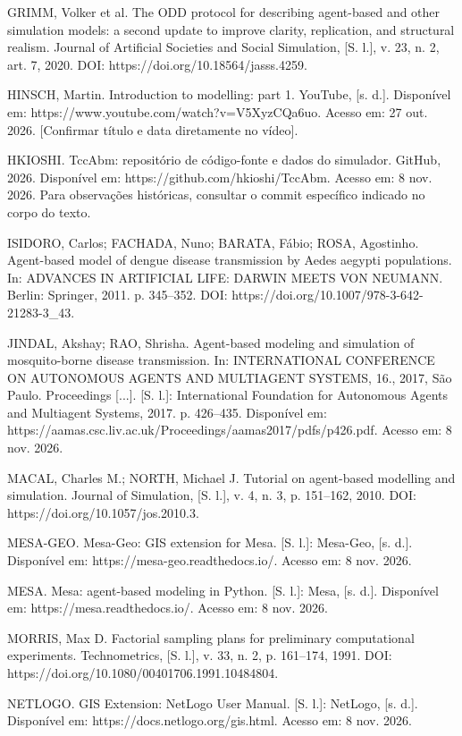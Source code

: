 GRIMM, Volker et al. The ODD protocol for describing agent-based and
other simulation models: a second update to improve clarity,
replication, and structural realism. Journal of Artificial Societies and
Social Simulation, {[}S. l.{]}, v. 23, n. 2, art. 7, 2020. DOI:
https://doi.org/10.18564/jasss.4259.

HINSCH, Martin. Introduction to modelling: part 1. YouTube, {[}s. d.{]}.
Disponível em: https://www.youtube.com/watch?v=V5XyzCQa6uo. Acesso em:
27 out. 2026. {[}Confirmar título e data diretamente no vídeo{]}.

HKIOSHI. TccAbm: repositório de código-fonte e dados do simulador.
GitHub, 2026. Disponível em: https://github.com/hkioshi/TccAbm. Acesso
em: 8 nov. 2026. Para observações históricas, consultar o commit
específico indicado no corpo do texto.

ISIDORO, Carlos; FACHADA, Nuno; BARATA, Fábio; ROSA, Agostinho.
Agent-based model of dengue disease transmission by Aedes aegypti
populations. In: ADVANCES IN ARTIFICIAL LIFE: DARWIN MEETS VON NEUMANN.
Berlin: Springer, 2011. p. 345--352. DOI:
https://doi.org/10.1007/978-3-642-21283-3\_43.

JINDAL, Akshay; RAO, Shrisha. Agent-based modeling and simulation of
mosquito-borne disease transmission. In: INTERNATIONAL CONFERENCE ON
AUTONOMOUS AGENTS AND MULTIAGENT SYSTEMS, 16., 2017, São Paulo.
Proceedings {[}...{]}. {[}S. l.{]}: International Foundation for
Autonomous Agents and Multiagent Systems, 2017. p. 426--435. Disponível
em: https://aamas.csc.liv.ac.uk/Proceedings/aamas2017/pdfs/p426.pdf.
Acesso em: 8 nov. 2026.

MACAL, Charles M.; NORTH, Michael J. Tutorial on agent-based modelling
and simulation. Journal of Simulation, {[}S. l.{]}, v. 4, n. 3, p.
151--162, 2010. DOI: https://doi.org/10.1057/jos.2010.3.

MESA-GEO. Mesa-Geo: GIS extension for Mesa. {[}S. l.{]}: Mesa-Geo, {[}s.
d.{]}. Disponível em: https://mesa-geo.readthedocs.io/. Acesso em: 8
nov. 2026.

MESA. Mesa: agent-based modeling in Python. {[}S. l.{]}: Mesa, {[}s.
d.{]}. Disponível em: https://mesa.readthedocs.io/. Acesso em: 8 nov.
2026.

MORRIS, Max D. Factorial sampling plans for preliminary computational
experiments. Technometrics, {[}S. l.{]}, v. 33, n. 2, p. 161--174, 1991.
DOI: https://doi.org/10.1080/00401706.1991.10484804.

NETLOGO. GIS Extension: NetLogo User Manual. {[}S. l.{]}: NetLogo, {[}s.
d.{]}. Disponível em: https://docs.netlogo.org/gis.html. Acesso em: 8
nov. 2026.

